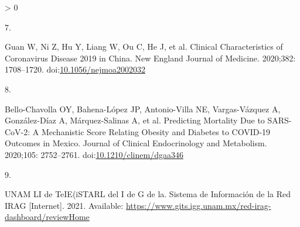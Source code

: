 \documentclass[10pt,letterpaper]{article}
\newlength{\csllabelwidth}
\newlength{\cslhangindent}
\newenvironment{CSLReferences}[3] %
 {%
  \setlength{\parindent}{0pt}
  \ifodd #1 \everypar{\setlength{\hangindent}{\cslhangindent}}\ignorespaces\fi
  \ifnum #2 > 0
  \setlength{\parskip}{#3\baselineskip}
  \fi
 }%
 {}
\newcommand{\CSLLeftMargin}[1]{\parbox[t]{\maxof{\widthof{#1}}{\csllabelwidth}}{#1}}
\newcommand{\CSLRightInline}[1]{\parbox[t]{\linewidth}{#1}}
\begin{document}
\begin{CSLReferences}{0}{0}
\leavevmode\hypertarget{ref-Guan2020}{}%
\CSLLeftMargin{7. }
\CSLRightInline{Guan W, Ni Z, Hu Y, Liang W, Ou C, He J, et al.
{Clinical Characteristics of Coronavirus Disease 2019 in China}. New
England Journal of Medicine. 2020;382: 1708--1720.
doi:\href{https://doi.org/10.1056/nejmoa2002032}{10.1056/nejmoa2002032}}

\leavevmode\hypertarget{ref-Bello-Chavolla2020}{}%
\CSLLeftMargin{8. }
\CSLRightInline{Bello-Chavolla OY, Bahena-López JP, Antonio-Villa NE,
Vargas-Vázquez A, González-Díaz A, Márquez-Salinas A, et al. {Predicting
Mortality Due to SARS-CoV-2: A Mechanistic Score Relating Obesity and
Diabetes to COVID-19 Outcomes in Mexico}. Journal of Clinical
Endocrinology and Metabolism. 2020;105: 2752--2761.
doi:\href{https://doi.org/10.1210/clinem/dgaa346}{10.1210/clinem/dgaa346}}

\leavevmode\hypertarget{ref-UNAM2021}{}%
\CSLLeftMargin{9. }
\CSLRightInline{UNAM LI de TeIE(iSTARL del I de G de la. {Sistema de
Informaci{ó}n de la Red IRAG} {[}Internet{]}. 2021. Available:
\url{https://www.gits.igg.unam.mx/red-irag-dashboard/reviewHome}}

\end{CSLReferences}

\nolinenumbers
\end{document}

